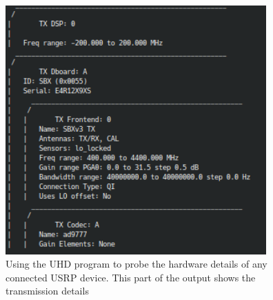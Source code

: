 \begin{figure}[h]
    \begin{centering}
        \includegraphics[width=10cm,keepaspectratio]{Figures/usrp-probe-output_3.png}
        \caption{Using the UHD program to probe the hardware details of any connected USRP device. This part of the output shows the transmission details}
    \label{fig:UHDProbe3}
    \end{centering}
\end{figure}

